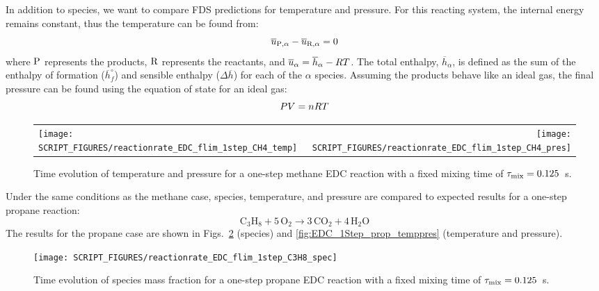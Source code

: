 \documentclass[11pt]{book}
\begin{document}
In addition to species, we want to compare FDS predictions for temperature and pressure. For this reacting system, the internal energy remains constant, thus the temperature can be found from:
\begin{equation}\label{eq:del_u}
\overline{u}_{{\rm P},\alpha} - \overline{u}_{{\rm R},\alpha} = 0
\end{equation}
where ${\rm P}$ represents the products, ${\rm R}$ represents the reactants, and $\overline{u}_{\alpha}=\overline{h}_{\alpha}-R T$. The total enthalpy, $\overline{h}_{\alpha}$, is defined as the sum of the enthalpy of formation ($\overline{h}_{f}^{\circ}$) and sensible enthalpy ($\Delta \overline{h}$) for each of the $\alpha$ species. Assuming the products behave like an ideal gas, the final pressure can be found using the equation of state for an ideal gas:
\begin{equation}\label{eq:ideal_gas}
PV = n R T
\end{equation}
\begin{figure}[!ht]
\begin{tabular*}{\textwidth}{lr}
\texttt{[image: SCRIPT\_FIGURES/reactionrate\_EDC\_flim\_1step\_CH4\_temp]} &
\texttt{[image: SCRIPT\_FIGURES/reactionrate\_EDC\_flim\_1step\_CH4\_pres]}
\end{tabular*}
\caption[Temperature and pressure evolution in a 1-step methane EDC reaction]{Time evolution of temperature and pressure for a one-step methane EDC reaction with a fixed mixing time of $\tau_{\rm mix}=0.125$~s.}
\label{fig:EDC_1Step_meth_temppres}
\end{figure}

Under the same conditions as the methane case, species, temperature, and pressure are compared to expected results for a one-step propane reaction:
\begin{equation}\label{eq:1step_propane}
\mathrm{C_3H_8 + 5\, O_2 \rightarrow  3\, CO_2 + 4\, H_2O}
\end{equation}
The results for the propane case are shown in Figs.~\ref{fig:EDC_1Step_prop_spec} (species) and \ref{fig:EDC_1Step_prop_temppres} (temperature and pressure).

\begin{figure}[!ht]
\centering
\texttt{[image: SCRIPT\_FIGURES/reactionrate\_EDC\_flim\_1step\_C3H8\_spec]}
\caption[Species evolution in a 1-step propane EDC reaction]{Time evolution of species mass fraction for a one-step propane EDC reaction with a fixed mixing time of $\tau_{\rm mix}=0.125$~s.}
\label{fig:EDC_1Step_prop_spec}
\end{figure}
\end{document}
